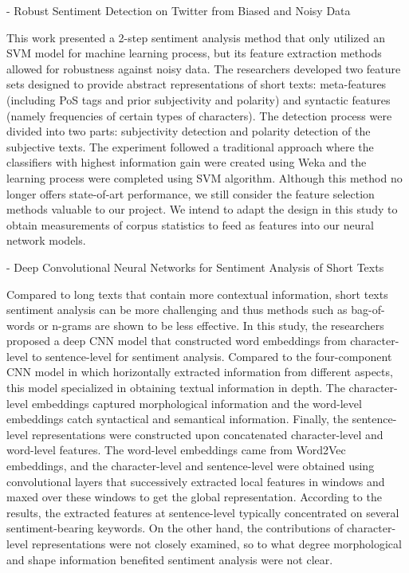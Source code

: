 \documentclass[12pt]{diazessay} %
\begin{document}
- Robust Sentiment Detection on Twitter from Biased and Noisy Data \citep{barbosa2010}

This work presented a 2-step sentiment analysis method that only utilized an SVM model for machine learning process, but its feature extraction methods allowed for robustness against noisy data. The researchers developed two feature sets designed to provide abstract representations of short texts: meta-features (including PoS tags and prior subjectivity and polarity) and syntactic features (namely frequencies of certain types of characters). The detection process were divided into two parts: subjectivity detection and polarity detection of the subjective texts. The experiment followed a traditional approach where the classifiers with highest information gain were created using Weka and the learning process were completed using SVM algorithm. Although this method no longer offers state-of-art performance, we still consider the feature selection methods valuable to our project. We intend to adapt the design in this study to obtain measurements of corpus statistics to feed as features into our neural network models. 

- Deep Convolutional Neural Networks for Sentiment Analysis of Short Texts \citep{santos2014}

Compared to long texts that contain more contextual information, short texts sentiment analysis can be more challenging and thus methods such as bag-of-words or n-grams are shown to be less effective\citep{barbosa2010, santos2014}. In this study, the researchers proposed a deep CNN model that constructed word embeddings from character-level to sentence-level for sentiment analysis. Compared to the four-component CNN model in \citep{poria2017} which horizontally extracted information from different aspects, this model specialized in obtaining textual information in depth. The character-level embeddings captured morphological information and the word-level embeddings catch syntactical and semantical information. Finally, the sentence-level representations were constructed upon concatenated character-level and word-level features. The word-level embeddings came from Word2Vec embeddings, and the character-level and sentence-level were obtained using convolutional layers that successively extracted local features in windows and maxed over these windows to get the global representation. According to the results, the extracted features at sentence-level typically concentrated on several sentiment-bearing keywords. On the other hand, the contributions of character-level representations were not closely examined, so to what degree morphological and shape information benefited sentiment analysis were not clear. 
\end{document}
